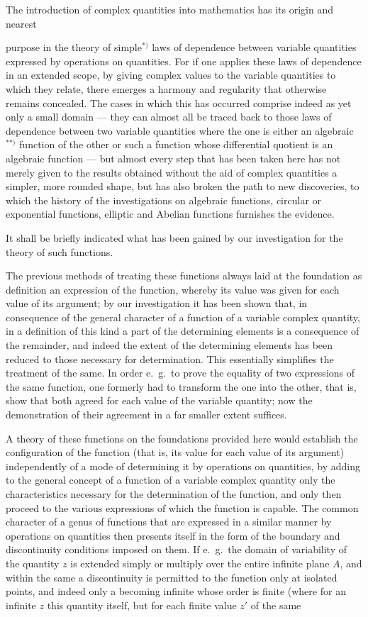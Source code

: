 \documentclass{article}
\begin{document}
The introduction of complex quantities into mathematics has its origin and nearest

purpose in the theory of simple${}^{*)}$ laws of dependence between variable quantities expressed by operations on quantities. For if one applies these laws of dependence in an extended scope, by giving complex values to the variable quantities to which they relate, there emerges a harmony and regularity that otherwise remains concealed. The cases in which this has occurred comprise indeed as yet only a small domain --- they can almost all be traced back to those laws of dependence between two variable quantities where the one is either an algebraic${}^{**)}$ function of the other or such a function whose differential quotient is an algebraic function --- but almost every step that has been taken here has not merely given to the results obtained without the aid of complex quantities a simpler, more rounded shape, but has also broken the path to new discoveries, to which the history of the investigations on algebraic functions, circular or exponential functions, elliptic and Abelian functions furnishes the evidence.

It shall be briefly indicated what has been gained by our investigation for the theory of such functions.

The previous methods of treating these functions always laid at the foundation as definition an expression of the function, whereby its value was given for each value of its argument; by our investigation it has been shown that, in consequence of the general character of a function of a variable complex quantity, in a definition of this kind a part of the determining elements is a consequence of the remainder, and indeed the extent of the determining elements has been reduced to those necessary for determination. This essentially simplifies the treatment of the same. In order e.\ g.\ to prove the equality of two expressions of the same function, one formerly had to transform the one into the other, that is, show that both agreed for each value of the variable quantity; now the demonstration of their agreement in a far smaller extent suffices.

A theory of these functions on the foundations provided here would establish the configuration of the function (that is, its value for each value of its argument) independently of a mode of determining it by operations on quantities, by adding to the general concept of a function of a variable complex quantity only the characteristics necessary for the determination of the function, and only then proceed to the various expressions of which the function is capable. The common character of a genus of functions that are expressed in a similar manner by operations on quantities then presents itself in the form of the boundary and discontinuity conditions imposed on them. If e.\ g.\ the domain of variability of the quantity $z$ is extended simply or multiply over the entire infinite plane $A$, and within the same a discontinuity is permitted to the function only at isolated points, and indeed only a becoming infinite whose order is finite (where for an infinite $z$ this quantity itself, but for each finite value $z'$ of the same
\end{document}

